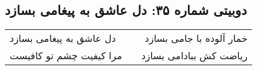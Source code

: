 \begin{center}
\section*{دوبیتی شماره ۳۵: دل عاشق به پیغامی بسازد}
\label{sec:035}
\begin{longtable}{l p{0.5cm} r}
دل عاشق به پیغامی بسازد
&&
خمار آلوده با جامی بسازد
\\
مرا کیفیت چشم تو کافیست
&&
ریاضت کش ببادامی بسازد
\\
\end{longtable}
\end{center}
